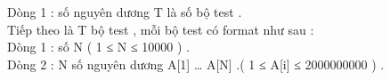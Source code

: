 Dòng 1 : số nguyên dương T là số bộ test .   
\\   Tiếp theo là T bộ test , mỗi bộ test có format như sau :   
\\   Dòng 1 : số N ( 1 ≤ N ≤ 10000 ) .   
\\   Dòng 2 : N số nguyên dương A[1] … A[N] .( 1 ≤ A[i] ≤ 2000000000 ) .   
\\